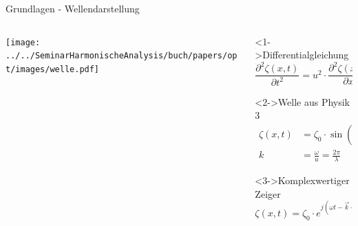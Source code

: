 \begin{frame}{Grundlagen - Wellendarstellung}
    \begin{columns}
        \begin{column}{0.5\textwidth}
            \begin{center}
                \texttt{[image: ../../SeminarHarmonischeAnalysis/buch/papers/opt/images/welle.pdf]}
            \end{center}
        \end{column}
        \begin{column}{0.5\textwidth}
            \begin{block}<1->{Differentialgleichung}
                \begin{equation*}
                    \frac{\partial^2\zeta(x, t)}{\partial t^2}
                    =
                    u^2 \cdot \frac{\partial^2\zeta(x, t)}{\partial x^2}
                \end{equation*}
            \end{block}
            \begin{block}<2->{Welle aus Physik 3 \cite{opt:HSR:Physik2}}
                \begin{align*}
                    \zeta(x, t)
                    &=
                    \zeta_0 \cdot \sin(\omega t - \vec{k}\cdot\vec{x})
                    \\
                    k
                    &=
                    \frac{\omega}{u}
                    =
                    \frac{2 \pi}{\lambda}
                \end{align*}
            \end{block}
            \begin{exampleblock}<3->{Komplexwertiger Zeiger}
                \begin{equation*}
                    \zeta(x, t)
                    =
                    \zeta_0 \cdot e^{j(\omega t - \vec{k}\cdot\vec{x})}      
                \end{equation*}
            \end{exampleblock}
        \end{column}
    \end{columns}
\end{frame}

